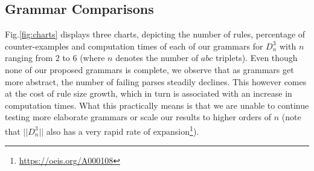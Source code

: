 \documentclass{llncs}
\begin{document}
\subsection{Grammar Comparisons}
Fig.\ref{fig:charts} displays three charts, depicting the number of rules, percentage of counter-examples and computation times of each of our grammars for $D^3_n$ with $n$ ranging from $2$ to $6$ (where $n$ denotes the number of $abc$ triplets). Even though none of our proposed grammars is complete, we observe that as grammars get more abstract, the number of failing parses steadily declines. This however comes at the cost of rule size growth, which in turn is associated with an increase in computation times. What this practically means is that we are unable to continue testing more elaborate grammars or scale our results to higher orders of $n$ (note that $| \! | D^3_n | \! |$ also has a very rapid rate of expansion\footnote{\url{https://oeis.org/A000108}}).
\end{document}
